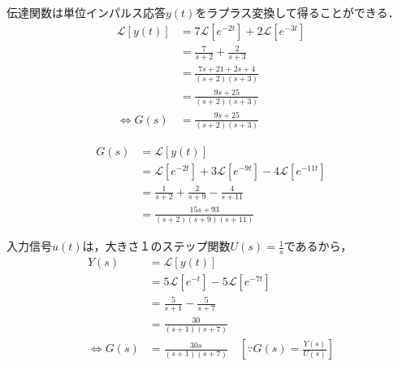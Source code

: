 \documentclass[a4paper,12pt]{article}
\begin{document}
\begin{tcolorbox}[title={[21] 単位インパルス応答が\(y(t)=7e^{-2t}+2e^{-3t}\)であるとき，\\ 
    \qquad このシステムの伝達関数を求めよ． }]

    伝達関数は単位インパルス応答\(y(t)\)をラプラス変換して得ることができる．
    \begin{align*}
        \mathcal{L} \left[ y(t) \right] 
        &= 7 \mathcal{L} \left[ e^{-2t} \right]+2 \mathcal{L} \left[ e^{-3t} \right]\\
        &= \frac{7}{s+2} + \frac{2}{s+3}\\
        &= \frac{7s+21+2s+4}{(s+2)(s+3)}\\
        &= \frac{9s+25}{(s+2)(s+3)}\\
        \Leftrightarrow G(s) &= \frac{9s+25}{(s+2)(s+3)}
    \end{align*}

\end{tcolorbox}
\begin{tcolorbox}[title={[22] 単位インパルス応答が\(y(t)=e^{-2t}+3e^{-9t}-4e^{-11t}\)であるとき，\\
    \qquad このシステムの伝達関数を求めよ． }]

    \begin{align*}
        G(s)
        &= \mathcal{L} \left[ y(t) \right] \\
        &= \mathcal{L} \left[ e^{-2t} \right]+3 \mathcal{L} \left[ e^{-9t} \right]-4 \mathcal{L} \left[ e^{-11t} \right]\\
        &= \frac{1}{s+2} + \frac{2}{s+9} - \frac{4}{s+11}\\
        &= \frac{15s+93}{(s+2)(s+9)(s+11)}
    \end{align*}

\end{tcolorbox}
\begin{tcolorbox}[title={[23] 単位ステップ応答が\(y(t)=5e^{-t}-5e^{-7t}\)であるとき，\\
    \qquad このシステムの伝達関数を求めよ． }]

    \qquad 入力信号\(u(t)\)は，大きさ１のステップ関数\(U(s)=\frac{1}{s}\)であるから，
    \begin{align*}
        Y(s)
        &= \mathcal{L} \left[ y(t) \right] \\
        &= 5\mathcal{L} \left[ e^{-t} \right]-5 \mathcal{L} \left[ e^{-7t} \right]\\
        &= \frac{5}{s+1} - \frac{5}{s+7} \\
        &= \frac{30}{(s+1)(s+7)}\\
        \Leftrightarrow G(s) &= \frac{30s}{(s+1)(s+7)} \quad [\because G(s)=\frac{Y(s)}{U(s)}]
    \end{align*}



\vspace{2mm}
\end{tcolorbox}
\end{document}
